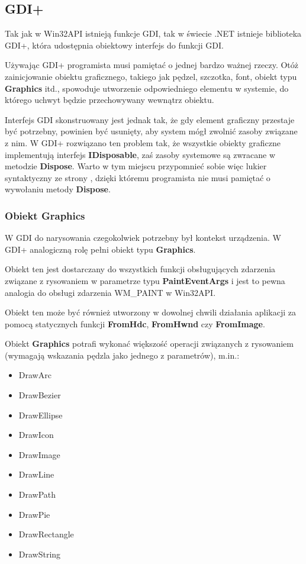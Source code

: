 ﻿\subsection{GDI+}

Tak jak w Win32API istnieją funkcje GDI, tak w świecie .NET istnieje biblioteka GDI+, która
udostępnia obiektowy interfejs do funkcji GDI. 

Używając GDI+ programista musi pamiętać o jednej bardzo ważnej rzeczy. Otóż zainicjowanie obiektu
graficznego, takiego jak pędzel, szczotka, font, obiekt typu {\bf Graphics} itd., spowoduje
utworzenie odpowiedniego elementu w systemie, do którego uchwyt będzie przechowywany wewnątrz obiektu.

Interfejs GDI skonstruowany jest jednak tak, że gdy element graficzny przestaje być potrzebny, powinien
być usunięty, aby system mógł zwolnić zasoby związane z nim. W GDI+ rozwiązano ten problem tak, że
wszystkie obiekty graficzne implementują interfejs {\bf IDisposable}, zaś zasoby systemowe są
zwracane w metodzie {\bf Dispose}. Warto w tym miejscu przypomnieć sobie więc lukier syntaktyczny
ze strony \pageref{disposeSyntaxSugar}, dzięki któremu programista nie musi pamiętać o wywołaniu
metody {\bf Dispose}.

\subsubsection{Obiekt {\bf Graphics}}

W GDI do narysowania czegokolwiek potrzebny był kontekst urządzenia. W GDI+ analogiczną rolę pełni
obiekt typu {\bf Graphics}. 

Obiekt ten jest dostarczany do wszystkich funkcji obsługujących
zdarzenia związane z rysowaniem w parametrze typu {\bf PaintEventArgs} i jest to pewna analogia
do obsługi zdarzenia WM\_PAINT w Win32API.

Obiekt ten może być również utworzony w dowolnej chwili działania aplikacji za pomocą statycznych funkcji
{\bf FromHdc}, {\bf FromHwnd} czy {\bf FromImage}.

Obiekt {\bf Graphics} potrafi wykonać większość operacji związanych z rysowaniem (wymagają wskazania
pędzla jako jednego z parametrów), m.in.:

\begin{itemize}
\item DrawArc
\item DrawBezier
\item DrawEllipse
\item DrawIcon
\item DrawImage
\item DrawLine
\item DrawPath
\item DrawPie
\item DrawRectangle
\item DrawString
\end{itemize}

